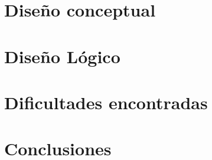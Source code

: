 \documentclass[12pt, a4paper, twoside]{article}
\begin{document}
	\section{Diseño conceptual}
	
	\section{Diseño Lógico}
	
	\section{Dificultades encontradas}
	
	\section{Conclusiones}

	
	\printbibliography
	
	
	
	
\end{document}
